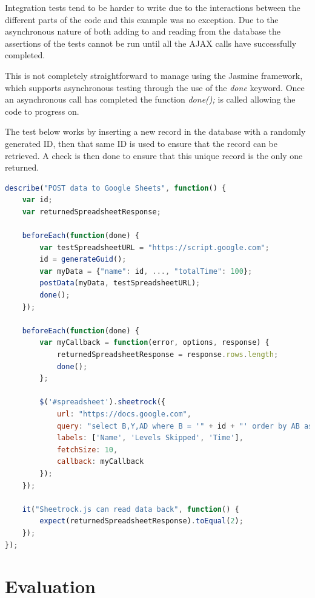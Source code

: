 \documentclass[12pt,a4paper]{report}
\begin{document}
Integration tests tend to be harder to write due to the interactions between the different parts of the code and this example was no exception. Due to the asynchronous nature of both adding to and reading from the database the assertions of the tests cannot be run until all the AJAX calls have successfully completed. 

This is not completely straightforward to manage using the Jasmine framework, which supports asynchronous testing through the use of the \textit{done} keyword. Once an asynchronous call has completed the function \textit{done();} is called allowing the code to progress on. 

The test below works by inserting a new record in the database with a randomly generated ID, then that same ID is used to ensure that the record can be retrieved. A check is then done to ensure that this unique record is the only one returned. 

\begin{minipage}{\linewidth}
\begin{lstlisting}[language=JavaScript]
describe("POST data to Google Sheets", function() {
    var id;
    var returnedSpreadsheetResponse;

    beforeEach(function(done) {
        var testSpreadsheetURL = "https://script.google.com";
        id = generateGuid();
        var myData = {"name": id, ..., "totalTime": 100};
        postData(myData, testSpreadsheetURL);
        done();
    });

    beforeEach(function(done) {
        var myCallback = function(error, options, response) {
            returnedSpreadsheetResponse = response.rows.length;
            done();
        };

        $('#spreadsheet').sheetrock({
            url: "https://docs.google.com",
            query: "select B,Y,AD where B = '" + id + "' order by AB asc",
            labels: ['Name', 'Levels Skipped', 'Time'],
            fetchSize: 10,
            callback: myCallback
        });
    });

    it("Sheetrock.js can read data back", function() {
        expect(returnedSpreadsheetResponse).toEqual(2);
    });
});
\end{lstlisting}
\end{minipage}

\chapter{Evaluation}
\end{document}
